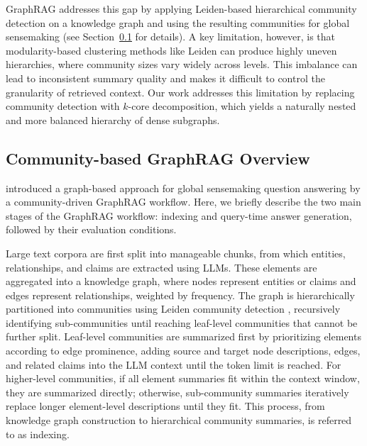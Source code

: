 \documentclass[sigconf]{acmart}
\begin{document}
GraphRAG \cite{edge24} addresses this gap by applying Leiden-based hierarchical community detection on a knowledge graph and using the resulting communities for global sensemaking (see Section~\ref{sec:graphrag_overview} for details).
A key limitation, however, is that modularity-based clustering methods like Leiden can produce highly uneven hierarchies, where community sizes vary widely across levels. This imbalance can lead to inconsistent summary quality and makes it difficult to control the granularity of retrieved context. Our work addresses this limitation by replacing community detection with $k$-core decomposition, which yields a naturally nested and more balanced hierarchy of dense subgraphs.

\subsection{Community-based GraphRAG Overview} \label{sec:graphrag_overview}


\citeauthor{edge24} \cite{edge24} introduced a graph-based approach for global sensemaking question answering by a community-driven GraphRAG workflow. Here, we briefly describe the two main stages of the GraphRAG workflow: indexing and query-time answer generation, followed by their evaluation conditions.

 Large text corpora are first split into manageable chunks, from which entities, relationships, and claims are extracted using LLMs. These elements are aggregated into a knowledge graph, where nodes represent entities or claims and edges represent relationships, weighted by frequency. The graph is hierarchically partitioned into communities using Leiden community detection \cite{traag19}, recursively identifying sub-communities until reaching leaf-level communities that cannot be further split.
Leaf-level communities are summarized first by prioritizing elements according to edge prominence, adding source and target node descriptions, edges, and related claims into the LLM context until the token limit is reached. For higher-level communities, if all element summaries fit within the context window, they are summarized directly; otherwise, sub-community summaries iteratively replace longer element-level descriptions until they fit. This process, from knowledge graph construction to hierarchical community summaries, is referred to as indexing.
\end{document}
